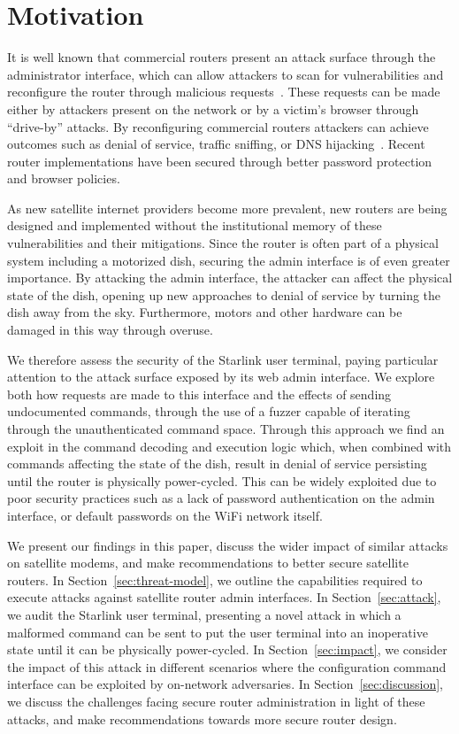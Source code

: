 \section{Motivation}\label{sec:motivation}

It is well known that commercial routers present an attack surface through the administrator interface, which can allow attackers to scan for vulnerabilities and reconfigure the router through malicious requests~\cite{niemietz2015owning}.
These requests can be made either by attackers present on the network or by a victim's browser through ``drive-by'' attacks.
By reconfiguring commercial routers attackers can achieve outcomes such as denial of service, traffic sniffing, or DNS hijacking~\cite{jeitner2022xdri}.
Recent router implementations have been secured through better password protection and browser policies.

As new satellite internet providers become more prevalent, new routers are being designed and implemented without the institutional memory of these vulnerabilities and their mitigations.
Since the router is often part of a physical system including a motorized dish, securing the admin interface is of even greater importance.
By attacking the admin interface, the attacker can affect the physical state of the dish, opening up new approaches to denial of service by turning the dish away from the sky.
Furthermore, motors and other hardware can be damaged in this way through overuse.

We therefore assess the security of the Starlink user terminal, paying particular attention to the attack surface exposed by its web admin interface.
We explore both how requests are made to this interface and the effects of sending undocumented commands, through the use of a fuzzer capable of iterating through the unauthenticated command space.
Through this approach we find an exploit in the command decoding and execution logic which, when combined with commands affecting the state of the dish, result in denial of service persisting until the router is physically power-cycled.
This can be widely exploited due to poor security practices such as a lack of password authentication on the admin interface, or default passwords on the WiFi network itself.

We present our findings in this paper, discuss the wider impact of similar attacks on satellite modems, and make recommendations to better secure satellite routers.
In Section~\ref{sec:threat-model}, we outline the capabilities required to execute attacks against satellite router admin interfaces.
In Section~\ref{sec:attack}, we audit the Starlink user terminal, presenting a novel attack in which a malformed command can be sent to put the user terminal into an inoperative state until it can be physically power-cycled.
In Section~\ref{sec:impact}, we consider the impact of this attack in different scenarios where the configuration command interface can be exploited by on-network adversaries.
In Section~\ref{sec:discussion}, we discuss the challenges facing secure router administration in light of these attacks, and make recommendations towards more secure router design.

